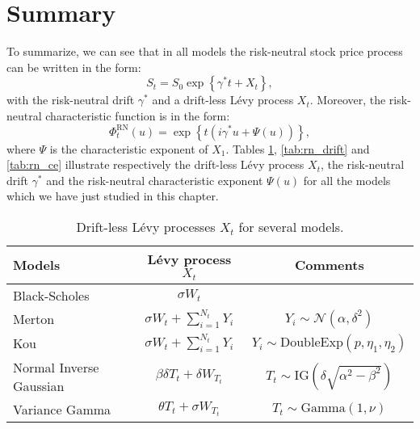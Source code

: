 \section{Summary}
To summarize, we can see that in all models the risk-neutral stock price process can be written in the form:
$$S_t = S_0\exp\left\{\gamma^\ast t + X_t\right\},$$
with the risk-neutral drift $\gamma^\ast$ and a drift-less L\'evy process $X_t$. Moreover, the risk-neutral characteristic function is in the form:
$$\Phi^\text{RN}_t(u) = \exp\left\{t\left(i\gamma^\ast u + \Psi(u)\right)\right\},$$
where $\Psi$ is the characteristic exponent of $X_1$. Tables \ref{tab:LevyPro}, \ref{tab:rn_drift} and \ref{tab:rn_ce} illustrate respectively the drift-less L\'evy process $X_t$, the risk-neutral drift $\gamma^\ast$ and the risk-neutral characteristic exponent $\Psi(u)$ for all the models which we have just studied in this chapter.
\vspace{3cm}
\begin{table}[!ht]
\centering
  \begin{tabular}{l|c|c}
    \toprule
    Models & L\'evy process $X_t$ & Comments\\
    \toprule
   Black-Scholes & $\sigma W_t$ & \\
   \midrule
   Merton & $\sigma W_t +\sum_{i=1}^{N_t}Y_i$ & $Y_i\sim\mathcal{N}(\alpha,\delta^2)$\\
   Kou & $\sigma W_t +\sum_{i=1}^{N_t}Y_i$ & $Y_i\sim\text{DoubleExp}(p,\eta_1,\eta_2)$\\
   \midrule
   Normal Inverse Gaussian & $\beta\delta T_t +\delta W_{T_t}$ & $T_t\sim \text{IG}\left(\delta\sqrt{\alpha^2-\beta^2}\right)$ \\
   Variance Gamma & $\theta T_t +\sigma W_{T_t}$ & $T_t\sim \text{Gamma}(1,\nu)$\\ 
    \bottomrule
  \end{tabular}
  \vspace{5pt}
  \caption{\label{tab:LevyPro} Drift-less L\'evy processes $X_t$ for several models.}
\end{table}

